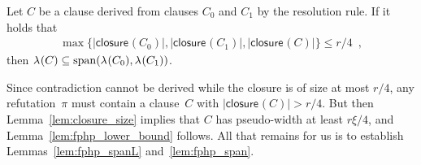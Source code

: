 \documentclass{article}
\newcommand{\maxofexpr}[2][]{\max_{#1} \{ #2 \}}
\newcommand{\setsize}[1]{\lvert#1\rvert}
\newcommand{\eqcomma}{\enspace ,}
\newcommand{\reflem}[1]{Lemma~\ref{#1}}
\newcommand{\reftwolems}[2]{Lemmas~\ref{#1} and~\ref{#2}}
\newcommand{\refpi}{\pi}
\newcommand{\diff}{\xi}
\newcommand{\linmap}[1][]{\ensuremath \lambda_{{#1}}}
\newcommand{\linmapof}[2][]{\linmap[#1](#2)}
\newcommand{\pseudowidth}{pseudo-width\xspace}
\newcommand{\closure}[2][]{\mathsf{closure}_{{#1}}(#2)}
\newcommand{\spans}[1]{\mathrm{span} ( #1 )}
\numberwithin{equation}{section}
\begin{document}
\begin{lemma}\label{lem:fphp_span}
  Let $C$ be a clause derived from clauses $C_0$ and $C_1$ by the
  resolution rule. If it holds that
  \begin{align*}
    \maxofexpr{
    \setsize{\closure{C_0}},
    \setsize{\closure{C_1}},
    \setsize{\closure{C}}
    }
    \leq r/4 \eqcomma
  \end{align*}
  then
  $\linmapof{C} \subseteq \spans{\linmapof{C_0}, \linmapof{C_1}}$.
\end{lemma}

Since contradiction cannot be derived while the closure is of size at
most $r/4$, any refutation~$\refpi$ must contain a clause~$C$ with
$\setsize{ \closure{C} } > r/4$.  But then \reflem{lem:closure_size}
implies that $C$ has \pseudowidth at least $r \diff / 4$, and
\reflem{lem:fphp_lower_bound} follows.  All that remains for us is to
establish \reftwolems {lem:fphp_spanL} {lem:fphp_span}.
\end{document}
